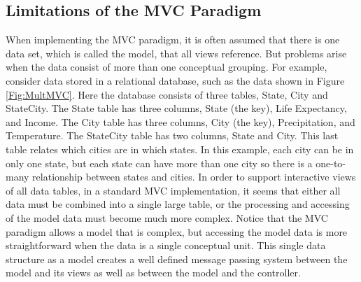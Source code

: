 \documentclass[11pt]{article}
\newcommand{\Rpackage}[1]{{\textit{#1}}}
\begin{document}

\subsection{Limitations of the MVC Paradigm}\label{Ssec:Limit}

When implementing the MVC paradigm, it is often assumed that there is 
one data set, which is called the model, that all views reference.  
But problems arise when the data consist of more than one conceptual 
grouping.  For example, consider data stored in a relational database, 
such as the data shown in Figure \ref{Fig:MultMVC}.
Here the database
consists of three tables, State, City and StateCity.  The State table
has three columns, State (the key), Life Expectancy, and Income.  The
City table has three columns, City (the key), Precipitation, and
Temperature.  The StateCity table has two columns, State and City.
This last table relates which cities are in which states.  In this
example, each city can be in only one state, but each state can have
more than one city so there is a one-to-many relationship between
states and cities.  In order to support interactive views of all data
tables, in a standard MVC implementation, it seems that either all 
data must be combined into a single large table, or
the processing and accessing of the model data must become much more
complex.  Notice that the MVC paradigm allows a model that is complex, but
accessing the model data is more straightforward when the data is a single
conceptual unit.  This single data structure as a model creates a well 
defined message passing system between the model and its views as well as
between the model and the controller.
\end{document}
